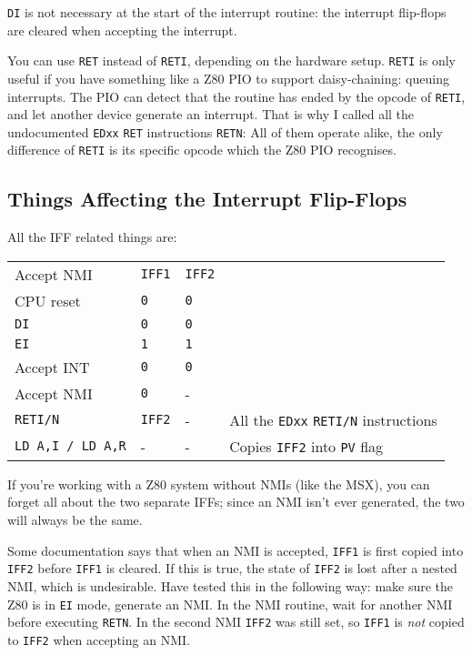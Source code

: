 {\tt DI} is not necessary at the start of the interrupt routine: the interrupt flip-flops are cleared when accepting the interrupt.

You can use {\tt RET} instead of {\tt RETI}, depending on the hardware setup. {\tt RETI} is only useful if you have something like a Z80 PIO to support daisy-chaining: queuing interrupts. The PIO can detect that the routine has ended by the opcode of {\tt RETI}, and let another device generate an interrupt. That is why I called all the undocumented {\tt EDxx} {\tt RET} instructions {\tt RETN}: All of them operate alike, the only difference of {\tt RETI} is its specific opcode which the Z80 PIO recognises.


\subsection{Things Affecting the Interrupt Flip-Flops}
\label{z80_interrupts_flipflop}

All the IFF related things are:

\begin{tabular}{llll}
	Accept NMI	& {\tt IFF1}	& {\tt IFF2} \\
	CPU reset	& {\tt 0}		& {\tt 0}\\
	{\tt DI}	& {\tt 0}		& {\tt 0}\\
	{\tt EI}	& {\tt 1}		& {\tt 1}\\
	Accept INT	& {\tt 0}		& {\tt 0}\\
	Accept NMI	& {\tt 0}		& -\\
	{\tt RETI/N}& {\tt IFF2}	& - & All the {\tt EDxx} {\tt RETI/N} instructions\\
	{\tt LD A,I / LD A,R} & - & - & Copies {\tt IFF2} into {\tt PV} flag
\end{tabular}

If you're working with a Z80 system without NMIs (like the MSX), you can forget all about the two separate IFFs; since an NMI isn't ever generated, the two will always be the same. 

Some documentation says that when an NMI is accepted, {\tt IFF1} is first copied into {\tt IFF2} before {\tt IFF1} is cleared. If this is true, the state of {\tt IFF2} is lost after a nested NMI, which is undesirable. Have tested this in the following way: make sure the Z80 is in {\tt EI} mode, generate an NMI. In the NMI routine, wait for another NMI before executing {\tt RETN}. In the second NMI {\tt IFF2} was still set, so {\tt IFF1} is {\em not} copied to {\tt IFF2} when accepting an NMI.

